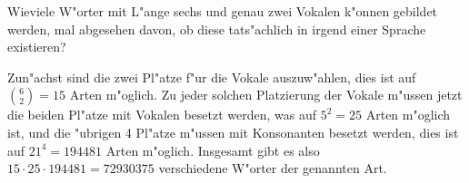 Wieviele W"orter mit L"ange sechs und genau zwei Vokalen k"onnen
gebildet werden,
mal abgesehen davon, ob diese tats"achlich in irgend einer Sprache
existieren?

\begin{loesung}
Zun"achst sind die zwei Pl"atze f"ur die Vokale auszuw"ahlen, dies
ist auf $\binom{6}{2}=15$ Arten m"oglich. Zu jeder solchen Platzierung
der Vokale m"ussen jetzt die beiden Pl"atze mit Vokalen besetzt
werden, was auf $5^2=25$ Arten m"oglich ist, und die "ubrigen 4 Pl"atze
m"ussen mit Konsonanten besetzt werden, dies ist auf $21^4=194481$
Arten m"oglich.
Insgesamt gibt es also $15\cdot 25\cdot 194481=72930375$
verschiedene W"orter der genannten Art.
\end{loesung}

